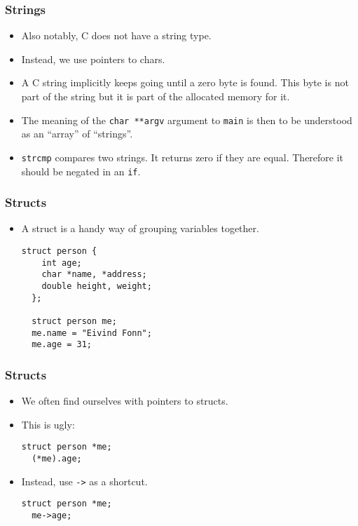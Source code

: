 \begin{frame}[fragile]
  \frametitle{Strings}
  \begin{itemize}
  \item Also notably, C does not have a string type.
  \item Instead, we use pointers to chars.
  \item A C string implicitly keeps going until a zero byte is found. This byte
    is not part of the string but it is part of the allocated memory for it.
  \item The meaning of the \texttt{char **argv} argument to \texttt{main} is
    then to be understood as an ``array'' of ``strings''.
  \item \texttt{strcmp} compares two strings. It returns zero if they are equal.
    Therefore it should be negated in an \texttt{if}.
  \end{itemize}
\end{frame}

\begin{frame}[fragile]
  \frametitle{Structs}
  \begin{itemize}
  \item A struct is a handy way of grouping variables together.
\begin{lstlisting}[style=c]
  struct person {
    int age;
    char *name, *address;
    double height, weight;
  };

  struct person me;
  me.name = "Eivind Fonn";
  me.age = 31;
\end{lstlisting}
  \end{itemize}
\end{frame}

\begin{frame}[fragile]
  \frametitle{Structs}
  \begin{itemize}
  \item We often find ourselves with pointers to structs.
  \item This is ugly:
\begin{lstlisting}[style=c]
  struct person *me;
  (*me).age;
\end{lstlisting}
  \item Instead, use \texttt{->} as a shortcut.
\begin{lstlisting}[style=c]
  struct person *me;
  me->age;
\end{lstlisting}
  \end{itemize}
\end{frame}

